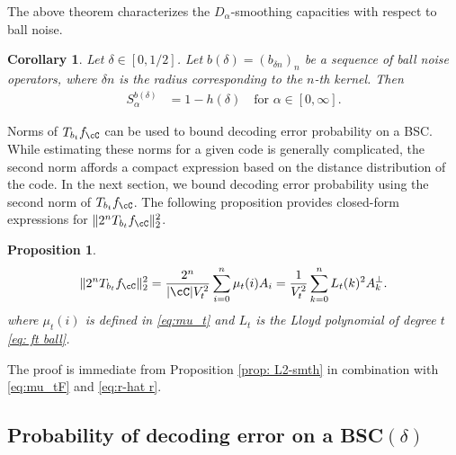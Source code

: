 \documentclass{amsart}
\newtheorem{proposition}[theorem]{Proposition}
\newtheorem{corollary}[theorem]{Corollary}
\theoremstyle{remark}
\begin{document}
The above theorem characterizes the $D_{\alpha}$-smoothing capacities with respect to ball noise.

\begin{corollary}\label{Cor: ball noise D_alpha cap}
Let $\delta \in [0,1/2]$. Let ${b}(\delta) = \left(b_{\delta n}\right)_n$ be a sequence of ball noise operators, where $\delta n$ is the radius corresponding to the $n$-th kernel. Then
    \begin{align*}
        S_{\alpha}^{{b}(\delta)} &= 1-h(\delta) \quad \text{for } \alpha \in [0,\infty].
    \end{align*}
\end{corollary}

Norms of $T_{b_{t}}f_{\cC}$ can be used to bound decoding error probability on a BSC. 
While estimating these norms for a given code is generally complicated,
the second norm affords a compact expression based on the distance distribution of the code. In the next section, we bound decoding error probability using the second norm of $T_{b_{t}}f_{\cC}$. The following proposition provides closed-form expressions for $\|2^nT_{b_{t}}f_{\cC}\|_2^2$.

\begin{proposition}\label{prop: ball noise L2} 
\begin{align*}
        \|2^nT_{b_{t}}f_{\cC}\|_2^2=\frac{2^n}{|\cC|V_t^2}\sum_{i=0}^n \mu_t(i)A_i = \frac{1}{V_t^2}\sum_{k=0}^n L_t(k)^2A_k^{\bot}.
\end{align*}
where $\mu_t(i)$ is defined in \eqref{eq:mu_t} and $L_t$ is the Lloyd polynomial of degree $t$ \eqref{eq: ft ball}.
\end{proposition}
The proof is immediate from Proposition \ref{prop: L2-smth} in combination with  \eqref{eq:mu_tF} and \eqref{eq:r-hat r}.

\subsection{Probability of decoding error on a BSC\texorpdfstring{$(\delta)$}{} }
\end{document}
